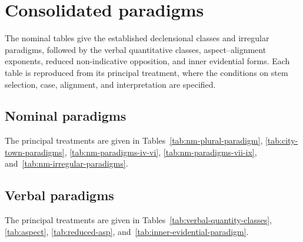 \chapter{Consolidated paradigms}\label{app:paradigms}

The nominal tables give the established declensional classes and irregular
paradigms, followed by the verbal quantitative classes, aspect--alignment
exponents, reduced non-indicative opposition, and inner evidential forms.
Each table is reproduced from its principal treatment, where the conditions
on stem selection, case, alignment, and interpretation are specified.

\paradigmappendixtrue
\section{Nominal paradigms}

The principal treatments are given in Tables~\ref{tab:nm-plural-paradigm}, \ref{tab:city-town-paradigms}, \ref{tab:nm-paradigms-iv-vi}, \ref{tab:nm-paradigms-vii-ix}, and~\ref{tab:nm-irregular-paradigms}.











\FloatBarrier
\section{Verbal paradigms}

The principal treatments are given in Tables~\ref{tab:verbal-quantity-classes}, \ref{tab:aspect}, \ref{tab:reduced-asp}, and~\ref{tab:inner-evidential-paradigm}.









\FloatBarrier
\paradigmappendixfalse
